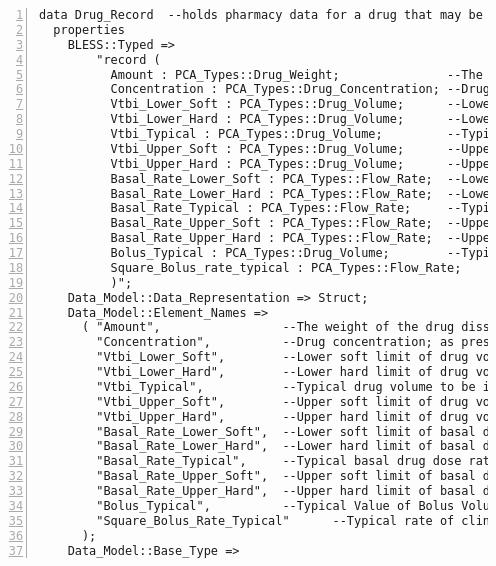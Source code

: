 \begin{lstlisting}[language=aadl, gobble=0, numbers=left, caption={\lstinline{PCA_Types} package}]
data Drug_Record  --holds pharmacy data for a drug that may be used with the pump
  properties
    BLESS::Typed =>
		"record (
		  Amount : PCA_Types::Drug_Weight;               --The weight of the drug dissolved in the diluent (mg)
		  Concentration : PCA_Types::Drug_Concentration; --Drug concentration; as prescribed
		  Vtbi_Lower_Soft : PCA_Types::Drug_Volume;      --Lower soft limit of drug volume to be infused
		  Vtbi_Lower_Hard : PCA_Types::Drug_Volume;      --Lower hard limit of drug volume to be infused
		  Vtbi_Typical : PCA_Types::Drug_Volume;         --Typical drug volume to be infused
		  Vtbi_Upper_Soft : PCA_Types::Drug_Volume;      --Upper soft limit of drug volume to be infused
		  Vtbi_Upper_Hard : PCA_Types::Drug_Volume;      --Upper hard limit of drug volume to be infused
		  Basal_Rate_Lower_Soft : PCA_Types::Flow_Rate;  --Lower soft limit of basal drug dose rate
		  Basal_Rate_Lower_Hard : PCA_Types::Flow_Rate;  --Lower hard limit of basal drug dose rate
		  Basal_Rate_Typical : PCA_Types::Flow_Rate;     --Typical basal drug dose rate
		  Basal_Rate_Upper_Soft : PCA_Types::Flow_Rate;  --Upper soft limit of basal drug dose rate
		  Basal_Rate_Upper_Hard : PCA_Types::Flow_Rate;  --Upper hard limit of basal drug dose rate
		  Bolus_Typical : PCA_Types::Drug_Volume;        --Typical Value of Bolus Volume
		  Square_Bolus_rate_typical : PCA_Types::Flow_Rate;        --Typical duration of clinician commanded bolus
		  )";
    Data_Model::Data_Representation => Struct;
    Data_Model::Element_Names => 
      ( "Amount",                 --The weight of the drug dissolved in the diluent (mg)
    	"Concentration",          --Drug concentration; as prescribed
    	"Vtbi_Lower_Soft",        --Lower soft limit of drug volume to be infused
    	"Vtbi_Lower_Hard",        --Lower hard limit of drug volume to be infused
    	"Vtbi_Typical",           --Typical drug volume to be infused
    	"Vtbi_Upper_Soft",        --Upper soft limit of drug volume to be infused
    	"Vtbi_Upper_Hard",        --Upper hard limit of drug volume to be infused
    	"Basal_Rate_Lower_Soft",  --Lower soft limit of basal drug dose rate
    	"Basal_Rate_Lower_Hard",  --Lower hard limit of basal drug dose rate
    	"Basal_Rate_Typical",     --Typical basal drug dose rate
    	"Basal_Rate_Upper_Soft",  --Upper soft limit of basal drug dose rate
    	"Basal_Rate_Upper_Hard",  --Upper hard limit of basal drug dose rate
    	"Bolus_Typical",          --Typical Value of Bolus Volume
    	"Square_Bolus_Rate_Typical"      --Typical rate of clinician commanded bolus
      );
    Data_Model::Base_Type => 

\end{lstlisting}

